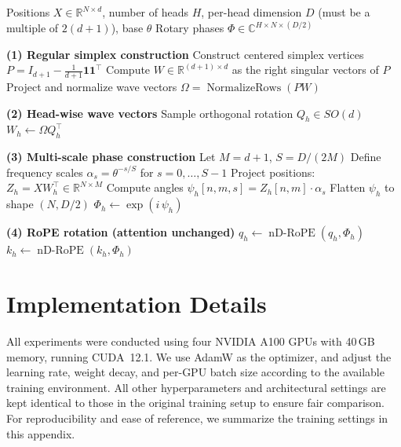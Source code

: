 \documentclass{article}
\theoremstyle{plain}
\theoremstyle{definition}
\theoremstyle{remark}
\begin{document}
\begin{algorithm}[t]
\caption{nD-RoPE with Regular Simplex Wave Vectors}
\label{alg:ndrope}
\begin{algorithmic}[1]
\REQUIRE Positions $X \in \mathbb{R}^{N \times d}$, number of heads $H$, per-head dimension $D$ (must be a multiple of $2(d+1)$), base $\theta$
\ENSURE Rotary phases $\Phi \in \mathbb{C}^{H \times N \times (D/2)}$

\STATE \textbf{(1) Regular simplex construction}
\STATE Construct centered simplex vertices $P = I_{d+1} - \frac{1}{d+1}\mathbf{1}\mathbf{1}^\top$
\STATE Compute $W \in \mathbb{R}^{(d+1)\times d}$ as the right singular vectors of $P$
\STATE Project and normalize wave vectors $\Omega = \operatorname{NormalizeRows}(P W)$

\STATE \textbf{(2) Head-wise wave vectors}
    \STATE Sample orthogonal rotation $Q_h \in SO(d)$
    \STATE $W_h \leftarrow \Omega Q_h^\top$
\ENDFOR

\STATE \textbf{(3) Multi-scale phase construction}
\STATE Let $M = d+1$, $S = D / (2M)$
\STATE Define frequency scales $\alpha_s = \theta^{-s/S}$ for $s=0,\dots,S-1$
    \STATE Project positions: $Z_h = X W_h^\top \in \mathbb{R}^{N \times M}$
    \STATE Compute angles $\psi_h[n,m,s] = Z_h[n,m] \cdot \alpha_s$
    \STATE Flatten $\psi_h$ to shape $(N, D/2)$
    \STATE $\Phi_h \leftarrow \exp(i\,\psi_h)$
\ENDFOR

\STATE \textbf{(4) RoPE rotation (attention unchanged)}
    \STATE $q_h \leftarrow \operatorname{nD-RoPE}(q_h, \Phi_h)$
    \STATE $k_h \leftarrow \operatorname{nD-RoPE}(k_h, \Phi_h)$
\ENDFOR
\end{algorithmic}
\end{algorithm}


\section{Implementation Details}
\label{ap:detail}
All experiments were conducted using four NVIDIA A100 GPUs with 40\,GB memory, 
running CUDA~12.1.  We use AdamW as the optimizer, and adjust the learning rate, weight decay, and per-GPU batch size according to the available training environment. All other hyperparameters and architectural settings are kept identical to those in the original training setup to ensure fair comparison. For reproducibility and ease of reference, we summarize the training settings in this appendix. 
\end{document}
